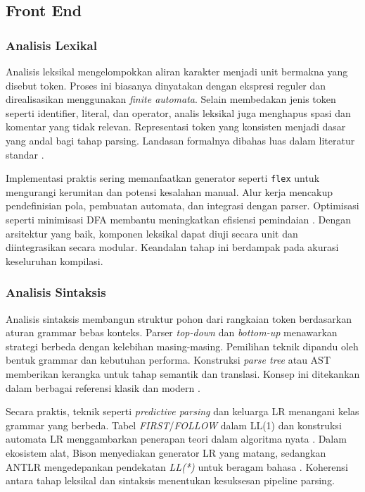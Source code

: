 \documentclass[../main.tex]{subfiles}
\begin{document}
\subsection{Front End}
\subsubsection{Analisis Lexikal}
Analisis leksikal mengelompokkan aliran karakter menjadi unit bermakna yang disebut token. Proses ini biasanya dinyatakan dengan ekspresi reguler dan direalisasikan menggunakan \emph{finite automata}. Selain membedakan jenis token seperti identifier, literal, dan operator, analis leksikal juga menghapus spasi dan komentar yang tidak relevan. Representasi token yang konsisten menjadi dasar yang andal bagi tahap parsing. Landasan formalnya dibahas luas dalam literatur standar \citep{WikiRegex,WikiDFA,WikiNFA}.

Implementasi praktis sering memanfaatkan generator seperti \texttt{flex} untuk mengurangi kerumitan dan potensi kesalahan manual. Alur kerja mencakup pendefinisian pola, pembuatan automata, dan integrasi dengan parser. Optimisasi seperti minimisasi DFA membantu meningkatkan efisiensi pemindaian \citep{WikiDFAMin}. Dengan arsitektur yang baik, komponen leksikal dapat diuji secara unit dan diintegrasikan secara modular. Keandalan tahap ini berdampak pada akurasi keseluruhan kompilasi.

\subsubsection{Analisis Sintaksis}
Analisis sintaksis membangun struktur pohon dari rangkaian token berdasarkan aturan grammar bebas konteks. Parser \emph{top-down} dan \emph{bottom-up} menawarkan strategi berbeda dengan kelebihan masing-masing. Pemilihan teknik dipandu oleh bentuk grammar dan kebutuhan performa. Konstruksi \emph{parse tree} atau AST memberikan kerangka untuk tahap semantik dan translasi. Konsep ini ditekankan dalam berbagai referensi klasik dan modern \citep{Mogensen2010,Wirth1996,WikiLL,WikiLR}.

Secara praktis, teknik seperti \emph{predictive parsing} dan keluarga LR menangani kelas grammar yang berbeda. Tabel \emph{FIRST}/\emph{FOLLOW} dalam LL(1) dan konstruksi automata LR menggambarkan penerapan teori dalam algoritma nyata \citep{WikiFirstFollow,WikiSLR,WikiLALR}. Dalam ekosistem alat, Bison menyediakan generator LR yang matang, sedangkan ANTLR mengedepankan pendekatan \emph{LL(*)} untuk beragam bahasa \citep{BisonManual,ANTLRDocs}. Koherensi antara tahap leksikal dan sintaksis menentukan kesuksesan pipeline parsing.
\end{document}
